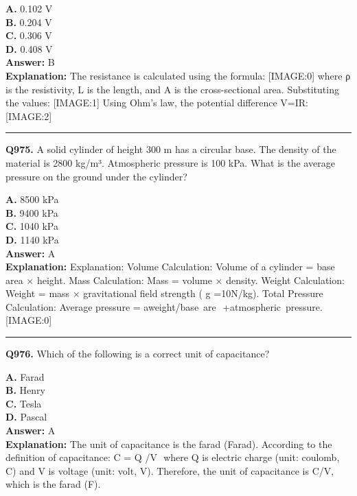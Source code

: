 \documentclass[12pt]{article}
\begin{document}
\textbf{A.} 0.102 V \\
\textbf{B.} 0.204 V \\
\textbf{C.} 0.306 V \\
\textbf{D.} 0.408 V \\

\textbf{Answer:} B \\
\textbf{Explanation:} The resistance is calculated using the formula:
[IMAGE:0]
where
ρ
is the resistivity,
L
is the length, and
A
is the cross-sectional area.
Substituting the values:
[IMAGE:1]
Using Ohm's law, the potential difference V=IR:
[IMAGE:2]

\hrule
\vspace{1em}


\noindent
\textbf{Q975.} A solid cylinder of height 300 m has a circular base. The density of the material is 2800 kg/m³. Atmospheric pressure is 100 kPa. What is the average pressure on the ground under the cylinder?



\textbf{A.} 8500 kPa \\
\textbf{B.} 9400 kPa \\
\textbf{C.} 1040 kPa \\
\textbf{D.} 1140 kPa \\

\textbf{Answer:} A \\
\textbf{Explanation:} Explanation:
Volume Calculation: Volume of a cylinder = base area × height.
Mass Calculation: Mass = volume × density.
Weight Calculation: Weight = mass × gravitational field strength (
g
=10N/kg).
Total Pressure Calculation: Average pressure = aweight/base are
​
+atmospheric pressure.
[IMAGE:0]

\hrule
\vspace{1em}


\noindent
\textbf{Q976.} Which of the following is a correct unit of capacitance?



\textbf{A.} Farad \\
\textbf{B.} Henry \\
\textbf{C.} Tesla \\
\textbf{D.} Pascal \\

\textbf{Answer:} A \\
\textbf{Explanation:} The unit of capacitance is the farad (Farad). According to the definition of capacitance:
C
=
Q
/V
​
where
Q
is electric charge (unit: coulomb, C) and
V
is voltage (unit: volt, V). Therefore, the unit of capacitance is C/V, which is the farad (F).
\end{document}

